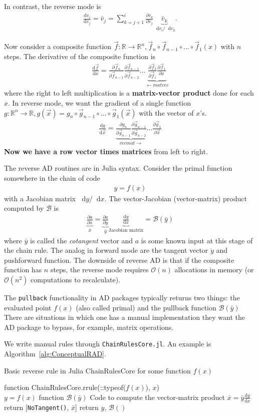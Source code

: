 \documentclass[10pt]{article}
\newcommand{\diff}{\mathop{}\!\tn{d}} %
\newcommand{\pp}[2]{\frac{\partial #1}{\partial #2}}
\newcommand{\dd}[2]{\frac{\textrm{d} #1}{\textrm{d} #2}}
\newcommand{\mbb}[1]{\mathbb{#1}} %
\newcommand{\mcal}[1]{\mathcal{#1}} %
\newcommand{\ben}{\begin{eqnarray*}}
\newcommand{\een}{\end{eqnarray*}}
\newcommand{\beq}{\begin{equation}\begin{aligned}}
\newcommand{\eeq}{\end{aligned}\end{equation}}
\newcommand{\BigO}{\mathcal{O}}
\newcommand{\tn}[1]{\textrm{#1}}
\begin{document}
In contrast, the reverse mode is
\beq
\dd{v_i}{v_j} = \bar{v}_j = \sum_{k=j+1}^{i}{\pp{v_k}{v_j}} \underbrace{\bar{v}_k}_{\diff{v_i}/\diff{v_k}}
.
\eeq

Now consider a composite function $\vec{f}: \mbb{R} \rightarrow \mbb{R}^n, \vec{f}_n \circ \vec{f}_{n-1} \circ \dots \circ \vec{f}_1(x)$ with $n$ steps.
The derivative of the composite function is
\beq
\dd{\vec{f}}{x} = \pp{\vec{f}_n}{\vec{f}_{n-1}} \pp{\vec{f}_{n-1}}{\vec{f}_{n-2}} \dots
\underbrace{\pp{\vec{f}_2}{\vec{f}_1} \pp{\vec{f}_1}{x}}_{\leftarrow matvec}
\eeq
where the right to left multiplication is a \textbf{matrix-vector product} done for each $x$.
In reverse mode, we want the gradient of a single function $g: \mbb{R}^n \rightarrow \mbb{R}, g(\vec{x}) = g_n \circ \vec{g}_{n-1}\circ \dots \circ \vec{g}_1(\vec{x})$ with the vector of $x$'s.
\beq
\dd{g}{\vec{x}}
=
\underbrace{\pp{g_n}{\vec{g}_{n-1}} \pp{\vec{g}_{n-1}}{\vec{g}_{n-2}}}_{vecmat \rightarrow}
\dots  \pp{\vec{g}_1}{\vec{x}}
\eeq
\textbf{Now we have a row vector times matrices} from left to right.

The reverse AD routines are in Julia syntax.
Consider the primal function somewhere in the chain of code
\ben
y = f(x)
\een
with a Jacobian matrix $\diff y/\diff x$.
The vector-Jacobian (vector-matrix) product computed by $\mcal{B}$ is
\ben
\underbrace{\pp{a}{x}}_{\bar{x}} =
\underbrace{\pp{a}{y}}_{\bar{y}}
\underbrace{\dd{y}{x}}_{\tn{Jacobian matrix}}
= \mcal{B}({\bar{y}})
\een
where $\bar{y}$ is called the \emph{cotangent} vector and $a$ is some known input at this stage of the chain rule.
The analog in forward mode are the tangent vector $\dot{y}$ and pushforward function.
The downside of reverse AD is that if the composite function has $n$ steps, the reverse mode requires $\BigO(n)$ allocations in memory (or $\BigO(n^2)$ computations to recalculate).

The \texttt{pullback} functionality in AD packages typically returns two things: the evaluated point $f(x)$ (also called primal) and the pullback function $\mcal{B}(\bar{y})$
There are situations in which one has a manual implementation they want the {AD} package to bypass, for example, matrix operations.

We write manual rules through \texttt{ChainRulesCore.jl}.
An example is Algorithm~\ref{alg:ConceptualRAD}.
\begin{algorithm}[htb!]
	\caption{\label{alg:ConceptualRAD} Basic reverse rule in Julia ChainRulesCore for some function $f(x)$}
	\DontPrintSemicolon
	function ChainRulesCore.rrule(::typeof($f(x)$), $x$)\\
	\quad $y = f(x)$ 
	\quad function $\mcal{B}(\bar{y})$\;
	\quad \quad Code to compute the vector-matrix product $\bar{x}= \bar{y} \dd{y}{x}$ 
	\quad return [\texttt{NoTangent()}, $\bar{x}$] 
	return $y$, $\mcal{B}()$
\end{algorithm}
\end{document}

